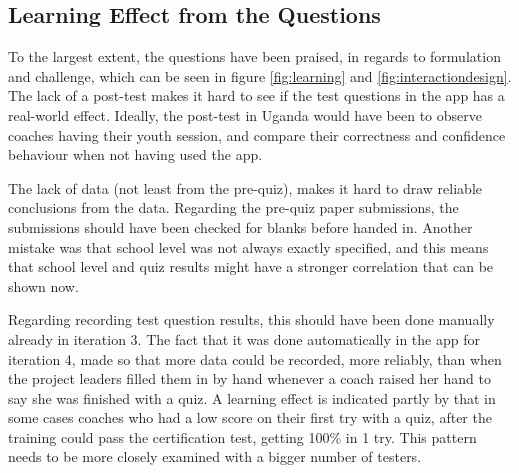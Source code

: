   \subsection{Learning Effect from the Questions}
  To the largest extent, the questions have been praised, in regards to formulation and challenge, which can be seen in figure \ref{fig:learning} and \ref{fig:interactiondesign}. The lack of a post-test makes it hard to see if the test questions in the app has a real-world effect. Ideally, the post-test in Uganda would have been to observe coaches having their youth session, and compare their correctness and confidence behaviour when not having used the app. %

  The lack of data (not least from the pre-quiz), makes it hard to draw reliable conclusions from the data. Regarding the pre-quiz paper submissions, the submissions should have been checked for blanks before handed in. Another mistake was that school level was not always exactly specified, and this means that school level and quiz results might have a stronger correlation that can be shown now.

  Regarding recording test question results, this should have been done manually already in iteration 3. The fact that it was done automatically in the app for iteration 4, made so that more data could be recorded, more reliably, than when the project leaders filled them in by hand whenever a coach raised her hand to say she was finished with a quiz. A learning effect is indicated partly by that in some cases coaches who had a low score on their first try with a quiz, after the training could pass the certification test, getting 100\% in 1 try. This pattern needs to be more closely examined with a bigger number of testers.
